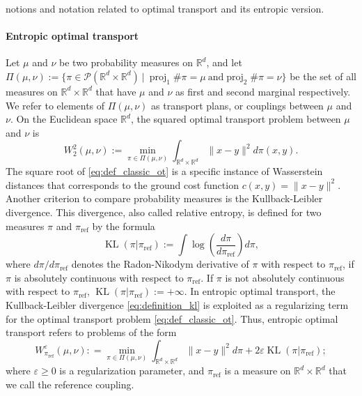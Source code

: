 \documentclass[]{article}
\DeclareMathOperator{\KL}{KL}
\DeclareMathOperator{\proj}{proj}
\DeclareMathOperator{\refe}{ref}
\numberwithin{equation}{section}
\theoremstyle{plain}
\begin{document}
notions and notation related to optimal transport and its entropic version.
    
\paragraph{Entropic optimal transport} Let $\mu$ and $\nu$ be two probability measures on $\mathbb{R}^d$, and let $\Pi(\mu, \nu) := \{\pi \in \mathcal{P}( \mathbb{R}^d \times  \mathbb{R}^d)~|~ \proj_1 \# \pi = \mu ~ \text{and} \proj_2 \# \pi = \nu \}$ be the set of all measures on $\mathbb{R}^d \times \mathbb{R}^d$ that have $\mu$ and $\nu$ as first and second marginal respectively. We refer to elements of $\Pi(\mu, \nu)$ as transport plans, or couplings between $\mu$ and $\nu$. On the Euclidean space $\mathbb{R}^d$, the squared optimal transport problem between $\mu$ and $\nu$ is
\begin{equation}\label{eq:def_classic_ot}
   W_2^2(\mu, \nu) := \min_{\pi \in \Pi(\mu, \nu)} \int_{ \mathbb{R}^d \times  \mathbb{R}^d} \|x-y\|^2 d \pi(x,y).
\end{equation} 
The square root  of \eqref{eq:def_classic_ot} is a specific instance of Wasserstein distances that corresponds to the ground cost function $c(x,y)= \|x-y\|^2$. Another criterion to compare probability measures is the Kullback-Leibler divergence. This divergence, also called relative entropy, is defined for two measures $\pi$ and $\pi_{\refe}$ by the formula
\begin{equation}\label{eq:definition_kl}
	\KL(\pi|\pi_{\refe}) := \int \log \left(\frac{d\pi}{d\pi_{\refe}} \right) d\pi,
\end{equation}
where $d\pi/d\pi_{\refe}$ denotes the Radon-Nikodym derivative of $\pi$ with respect to $\pi_{\refe}$, if $\pi$ is absolutely continuous with respect to $\pi_{\refe}$. If $\pi$ is not absolutely continuous with respect to $\pi_{\refe}$, $\KL(\pi|\pi_{\refe}):= +\infty$. In entropic optimal transport, the Kullback-Leibler divergence \eqref{eq:definition_kl} is exploited as a regularizing term for the optimal transport problem \eqref{eq:def_classic_ot}. Thus, entropic optimal transport refers to problems of the form
\begin{equation}\label{eq:def_entropic_ot}
	W_{\pi_{\refe}}^{\varepsilon}(\mu, \nu): = \min_{\pi \in \Pi(\mu, \nu)}\int_{\mathbb{R}^d \times \mathbb{R}^d}\|x-y\|^2 d\pi + 2\varepsilon\KL(\pi|\pi_{\refe});
\end{equation}
where $\varepsilon \geq 0$ is a regularization parameter, and $\pi_{\refe}$ is a measure on $\mathbb{R}^d \times \mathbb{R}^d$ that we call the reference coupling.
\end{document}
